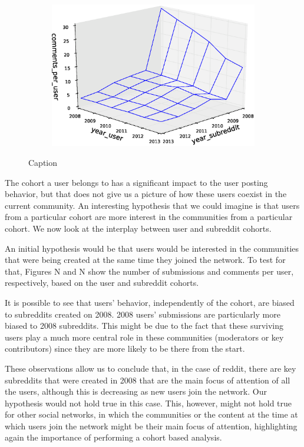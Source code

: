 \begin{figure}[!tb]
\begin{subfigure}{.3\textwidth}\includegraphics[scale=0.285]{./images/user_subreddit_comments_cohorts.eps}\caption{}\end{subfigure}
\caption{Caption}
\label{fig:user_subreddit_submissions_cohorts}
\end{figure}

The cohort a user belongs to has a significant impact to the user posting behavior, but that does not give us a picture of how these users coexist in the current community. An interesting hypothesis that we could imagine is that users from a particular cohort are more interest in the communities from a particular cohort. We now look at the interplay between user and subreddit cohorts. 

An initial hypothesis would be that users would be interested in the communities that were being created at the same time they joined the network. To test for that, Figures N and N show the number of submissions and comments per user, respectively, based on the user and subreddit cohorts.

It is possible to see that users' behavior, independently of the cohort, are biased to subreddits created on 2008. 2008 users' submissions are particularly more biased to 2008 subreddits. This might be due to the fact that these surviving users play a much more central role in these communities (moderators or key contributors) since they are more likely to be there from the start.

These observations allow us to conclude that, in the case of reddit, there are key subreddits that were created in 2008 that are the main focus of attention of all the users, although this is decreasing as new users join the network. Our hypothesis would not hold true in this case. This, however, might not hold true for other social networks, in which the communities or the content at the time at which users join the network might be their main focus of attention, highlighting again the importance of performing a cohort based analysis.
